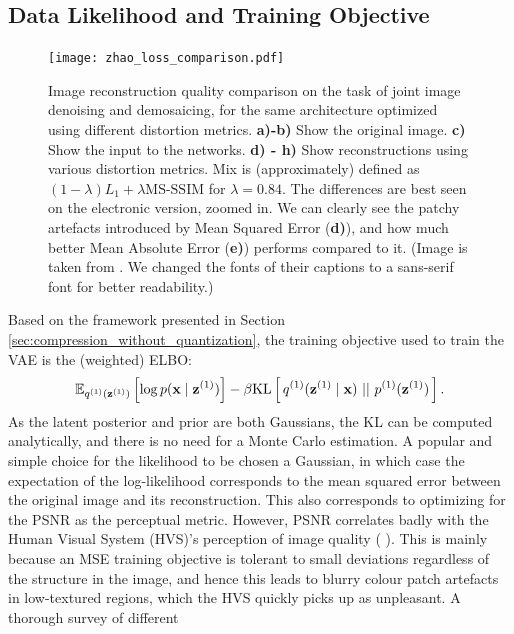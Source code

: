 \subsection{Data Likelihood and Training Objective}
\begin{figure}
  \centering
  \texttt{[image: zhao\_loss\_comparison.pdf]}
  \caption[Loss comparison for neural image reconstruction.]
  {Image reconstruction quality comparison on the task of joint
    image denoising and demosaicing, for the same architecture optimized using
    different distortion metrics. \textbf{a)-b)} Show the original image.
    \textbf{c)} Show the input to the networks. \textbf{d) - h)} Show
    reconstructions using various distortion metrics. Mix is (approximately)
    defined as $(1 - \lambda) L_1 + \lambda \text{MS-SSIM}$ for $\lambda = 0.84$.
    The differences are best
    seen on the electronic version, zoomed in. We can clearly see the patchy
    artefacts introduced by Mean Squared Error (\textbf{d)}), and how much
    better Mean Absolute Error (\textbf{e)}) performs compared to it.
    (Image is taken from \cite{zhao2015loss}. We changed the fonts of their
    captions to a sans-serif font for better readability.)}
  \label{fig:zhao_loss_comparison}
\end{figure}
\par
Based on the framework presented in Section
\ref{sec:compression_without_quantization}, the training objective used to train
the VAE is the (weighted) ELBO:
\begin{equation}
\label{eq:regular_vae_elbo}
\Exp{\log p(\vec{x} \mid \vec{z}^{(1)})}{q^{(1)}(\vec{z}^{(1)})}
- \beta \KL{q^{(1)}(\vec{z}^{(1)} \mid \vec{x})}{p^{(1)}(\vec{z}^{(1)})}.
\end{equation}
As the latent posterior and prior are both Gaussians, the KL can be computed
analytically, and there is no need for a Monte Carlo estimation. A popular and
simple choice for the likelihood to be chosen a Gaussian, in which case the
expectation of the log-likelihood corresponds to the mean squared error
between the original image and its reconstruction. This also corresponds to
optimizing for the PSNR as the perceptual metric. However, PSNR correlates badly
with the Human Visual System (HVS)'s perception of image quality (\cite{girod1993s}
\cite{eskicioglu1994image}). This is mainly because an MSE training objective is
tolerant to small deviations regardless of the structure in the image, and hence
this leads to blurry colour patch artefacts in low-textured regions, which the
HVS quickly picks up as unpleasant. A thorough survey of different

